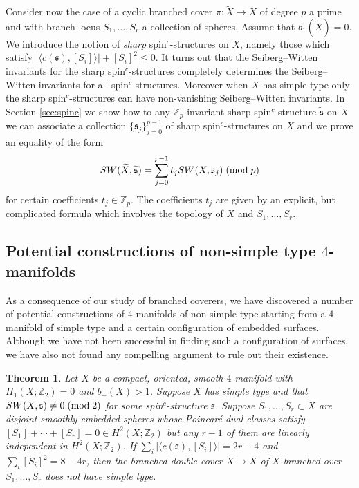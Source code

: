 \documentclass{amsart}
\newtheorem{theorem}{Theorem}[section]
\theoremstyle{definition}
\theoremstyle{remark}
\numberwithin{equation}{section}
\begin{document}
Consider now the case of a cyclic branched cover $\pi : \widetilde{X} \to X$ of degree $p$ a prime and with branch locus $S_1, \dots, S_r$ a collection of spheres. Assume that $b_1(\widetilde{X}) = 0$. We introduce the notion of {\em sharp} spin$^c$-structures on $X$, namely those which satisfy $| \langle c(\mathfrak{s}) , [S_i] \rangle | + [S_i]^2 \le 0$. It turns out that the Seiberg--Witten invariants for the sharp spin$^c$-structures completely determines the Seiberg--Witten invariants for all spin$^c$-structures. Moreover when $X$ has simple type only the sharp spin$^c$-structures can have non-vanishing Seiberg--Witten invariants. In Section \ref{sec:spinc} we show how to any $\mathbb{Z}_p$-invariant sharp spin$^c$-structure $\widetilde{\mathfrak{s}}$ on $\widetilde{X}$ we can associate a collection $\{ \mathfrak{s}_j \}_{j=0}^{p-1}$ of sharp spin$^c$-structures on $X$ and we prove an equality of the form
\[
SW(\widetilde{X} , \widetilde{\mathfrak{s}} ) = \sum_{j=0}^{p-1} t_j SW(X , \mathfrak{s}_j) \; ({\rm mod} \; p)
\]
for certain coefficients $t_j \in \mathbb{Z}_p$. The coefficients $t_j$ are given by an explicit, but complicated formula which involves the topology of $X$ and $S_1, \dots , S_r$.



\subsection{Potential constructions of non-simple type $4$-manifolds}

As a consequence of our study of branched coverers, we have discovered a number of potential constructions of $4$-manifolds of non-simple type starting from a $4$-manifold of simple type and a certain configuration of embedded surfaces. Although we have not been successful in finding such a configuration of surfaces, we have also not found any compelling argument to rule out their existence.

\begin{theorem}
Let $X$ be a compact, oriented, smooth $4$-manifold with $H_1(X ; \mathbb{Z}_2) = 0$ and $b_+(X) > 1$. Suppose $X$ has simple type and that $SW(X , \mathfrak{s}) \neq 0 \; ({\rm mod} \; 2)$ for some spin$^c$-structure $\mathfrak{s}$. Suppose $S_1, \dots , S_r \subset X$ are disjoint smoothly embedded spheres whose Poincar\'e dual classes satisfy $[S_1] + \cdots + [S_r] = 0 \in H^2(X ; \mathbb{Z}_2)$ but any $r-1$ of them are linearly independent in $H^2(X ; \mathbb{Z}_2)$. If $\sum_i | \langle c(\mathfrak{s}) , [S_i] \rangle | = 2r-4$ and $\sum_i [S_i]^2 = 8-4r$, then the branched double cover $\widetilde{X} \to X$ of $X$ branched over $S_1, \dots , S_r$ does not have simple type.
\end{theorem}
\end{document}
